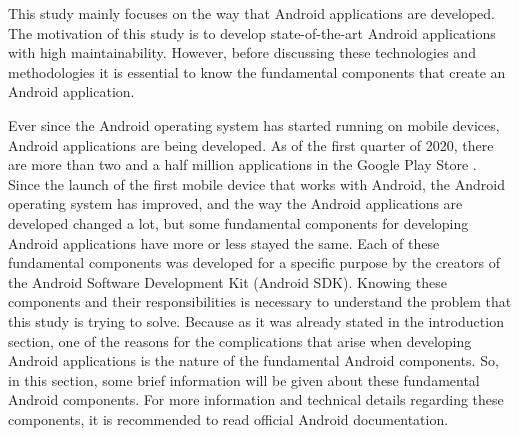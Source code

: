 This study mainly focuses on the way that Android applications are developed. The motivation of this study is to develop state-of-the-art Android applications with high maintainability. However, before discussing these technologies and methodologies it is essential to know the fundamental components that create an Android application. 

Ever since the Android operating system has started running on mobile devices, Android applications are being developed. As of the first quarter of 2020, there are more than two and a half million applications in the Google Play Store \cite{8}. Since the launch of the first mobile device that works with Android,  the Android operating system has improved, and the way the Android applications are developed changed a lot, but some fundamental components for developing Android applications have more or less stayed the same. Each of these fundamental components was developed for a specific purpose by the creators of the Android Software Development Kit (Android SDK). Knowing these components and their responsibilities is necessary to understand the problem that this study is trying to solve. Because as it was already stated in the introduction section, one of the reasons for the complications that arise when developing Android applications is the nature of the fundamental Android components. So, in this section, some brief information will be given about these fundamental Android components. For more information and technical details regarding these components, it is recommended to read official Android documentation.

